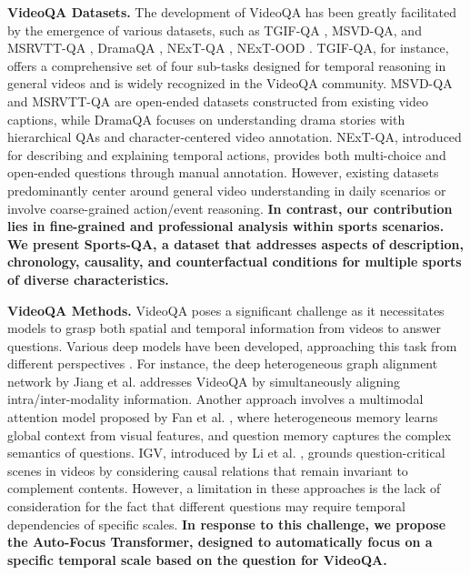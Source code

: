 \noindent\textbf{VideoQA Datasets.}  The development of VideoQA has been greatly facilitated by the emergence of various datasets, such as TGIF-QA \citep{jang2017tgif}, MSVD-QA, and MSRVTT-QA \citep{xu2017video}, DramaQA \citep{choi2021dramaqa}, NExT-QA \citep{xiao2021next}, NExT-OOD \citep{10107423}. TGIF-QA, for instance, offers a comprehensive set of four sub-tasks designed for temporal reasoning in general videos and is widely recognized in the VideoQA community. MSVD-QA and MSRVTT-QA are open-ended datasets constructed from existing video captions, while DramaQA focuses on understanding drama stories with hierarchical QAs and character-centered video annotation. NExT-QA, introduced for describing and explaining temporal actions, provides both multi-choice and open-ended questions through manual annotation. However, existing datasets predominantly center around general video understanding in daily scenarios or involve coarse-grained action/event reasoning. \textbf{In contrast, our contribution lies in fine-grained and professional analysis within sports scenarios. We present Sports-QA, a dataset that addresses aspects of description, chronology, causality, and counterfactual conditions for multiple sports of diverse characteristics.}

\noindent\textbf{VideoQA Methods.} 
VideoQA poses a significant challenge as it necessitates models to grasp both spatial and temporal information from videos to answer questions. Various deep models have been developed, approaching this task from different perspectives \citep{fan2019heterogeneous,jiang2020reasoning,li2022invariant,antol2015vqa,gao2018motion,10172254,9770842,10214041,10146482}.
For instance, the deep heterogeneous graph alignment network by Jiang et al. \citep{jiang2020reasoning} addresses VideoQA by simultaneously aligning intra/inter-modality information. Another approach involves a multimodal attention model proposed by Fan et al. \citep{fan2019heterogeneous}, where heterogeneous memory learns global context from visual features, and question memory captures the complex semantics of questions.
IGV, introduced by Li et al. \citep{li2022invariant}, grounds question-critical scenes in videos by considering causal relations that remain invariant to complement contents.
However, a limitation in these approaches is the lack of consideration for the fact that different questions may require temporal dependencies of specific scales. \textbf{In response to this challenge, we propose the Auto-Focus Transformer, designed to automatically focus on a specific temporal scale based on the question for VideoQA.}

